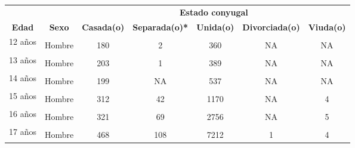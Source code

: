 \begin{tabular}[t]{ccccccc}
\toprule
\multicolumn{1}{c}{\textbf{ }} & \multicolumn{1}{c}{\textbf{ }} & \multicolumn{5}{c}{\textbf{Estado conyugal}} \\
\cmidrule(l{3pt}r{3pt}){3-7}
\textbf{Edad} & \textbf{Sexo} & \textbf{Casada(o)} & \textbf{Separada(o)*} & \textbf{Unida(o)} & \textbf{Divorciada(o)} & \textbf{Viuda(o)}\\
\midrule
\multirow{2}{1 cm}{12 años} & \cellcolor[HTML]{B6B3FF}{Mujer} & \cellcolor[HTML]{B6B3FF}{114} & \cellcolor[HTML]{B6B3FF}{4} & \cellcolor[HTML]{B6B3FF}{385} & \cellcolor[HTML]{B6B3FF}{NA} & \cellcolor[HTML]{B6B3FF}{NA}\\
 & Hombre & 180 & 2 & 360 & NA & NA\\
\multirow{2}{1 cm}{13 años} & \cellcolor[HTML]{B6B3FF}{Mujer} & \cellcolor[HTML]{B6B3FF}{99} & \cellcolor[HTML]{B6B3FF}{13} & \cellcolor[HTML]{B6B3FF}{640} & \cellcolor[HTML]{B6B3FF}{NA} & \cellcolor[HTML]{B6B3FF}{NA}\\
 & Hombre & 203 & 1 & 389 & NA & NA\\
\multirow{2}{1 cm}{14 años} & \cellcolor[HTML]{B6B3FF}{Mujer} & \cellcolor[HTML]{B6B3FF}{177} & \cellcolor[HTML]{B6B3FF}{51} & \cellcolor[HTML]{B6B3FF}{2260} & \cellcolor[HTML]{B6B3FF}{NA} & \cellcolor[HTML]{B6B3FF}{NA}\\
 & Hombre & 199 & NA & 537 & NA & NA\\
\multirow{2}{1 cm}{15 años} & \cellcolor[HTML]{B6B3FF}{Mujer} & \cellcolor[HTML]{B6B3FF}{367} & \cellcolor[HTML]{B6B3FF}{287} & \cellcolor[HTML]{B6B3FF}{6878} & \cellcolor[HTML]{B6B3FF}{2} & \cellcolor[HTML]{B6B3FF}{5}\\
 & Hombre & 312 & 42 & 1170 & NA & 4\\
\multirow{2}{1 cm}{16 años} & \cellcolor[HTML]{B6B3FF}{Mujer} & \cellcolor[HTML]{B6B3FF}{685} & \cellcolor[HTML]{B6B3FF}{522} & \cellcolor[HTML]{B6B3FF}{14356} & \cellcolor[HTML]{B6B3FF}{NA} & \cellcolor[HTML]{B6B3FF}{6}\\
 & Hombre & 321 & 69 & 2756 & NA & 5\\
\multirow{2}{1 cm}{17 años} & \cellcolor[HTML]{B6B3FF}{Mujer} & \cellcolor[HTML]{B6B3FF}{1881} & \cellcolor[HTML]{B6B3FF}{1106} & \cellcolor[HTML]{B6B3FF}{27467} & \cellcolor[HTML]{B6B3FF}{1} & \cellcolor[HTML]{B6B3FF}{16}\\
 & Hombre & 468 & 108 & 7212 & 1 & 4\\
\bottomrule
\end{tabular}
